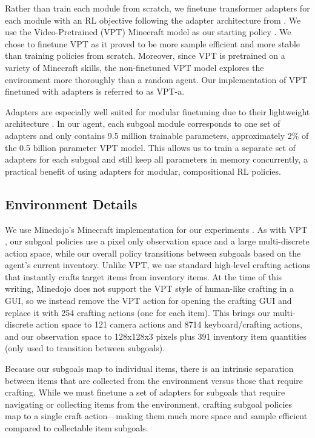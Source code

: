 \documentclass[nohyperref]{article}
\theoremstyle{plain}
\theoremstyle{definition}
\theoremstyle{remark}
\begin{document}
Rather than train each module from scratch, we finetune transformer adapters for each module with an RL objective following the adapter architecture from \citet{houlsby2019parameter}. 
We use the Video-Pretrained (VPT) Minecraft model as our starting policy \cite{bakervideo}.
We chose to finetune VPT as it proved to be more sample efficient and more stable than training policies from scratch.
Moreover, since VPT is pretrained on a variety of Minecraft skills, the non-finetuned VPT model explores the environment more thoroughly than a random agent.
Our implementation of VPT finetuned with adapters is referred to as VPT-a.

Adapters are especially well suited for modular finetuning due to their lightweight architecture \cite{liang2022transformer}. 
In our agent, each subgoal module corresponds to one set of adapters and only contains 9.5 million trainable parameters, approximately 2\% of the 0.5 billion parameter VPT model. 
This allows us to train a separate set of adapters for each subgoal and still keep all parameters in memory concurrently, a practical benefit of using adapters for modular, compositional RL policies.

\subsection{Environment Details}
\label{sec:env}

We use Minedojo's Minecraft implementation for our experiments \cite{fanminedojo}. 
As with VPT \cite{bakervideo}, our subgoal policies use a pixel only observation space and a large multi-discrete action space, while our overall policy transitions between subgoals based on the agent's current inventory.
Unlike VPT, we use standard high-level crafting actions that instantly crafts target items from inventory items.
At the time of this writing, Minedojo does not support the VPT style of human-like crafting in a GUI, so we instead remove the VPT action for opening the crafting GUI and replace it with 254 crafting actions (one for each item). 
This brings our multi-discrete action space to 121 camera actions and 8714 keyboard/crafting actions, and our observation space to 128x128x3 pixels plus 391 inventory item quantities (only used to transition between subgoals).

Because our subgoals map to individual items, there is an intrinsic separation between items that are collected from the environment versus those that require crafting.
While we must finetune a set of adapters for subgoals that require navigating or collecting items from the environment, crafting subgoal policies map to a single craft action---making them much more space and sample efficient compared to collectable item subgoals.
\end{document}
